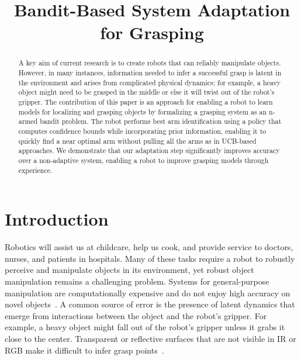 \documentclass{article}
\title{Bandit-Based System Adaptation for Grasping}
\author{}
\begin{document}
\maketitle

\begin{abstract}
A key aim of current research is to create robots that can reliably
manipulate objects.  However, in many instances, information needed to
infer a successful grasp is latent in the environment and arises from
complicated physical dynamics; for example, a heavy object might need
to be grasped in the middle or else it will twist out of the robot's
gripper.  The contribution of this paper is an approach for enabling a
robot to learn models for localizing and grasping objects by
formalizing a grasping system as an n-armed bandit problem.  The robot
performs best arm identification using a policy that computes
confidence bounds while incorporating prior information, enabling it
to quickly find a near optimal arm without pulling all the arms as in
UCB-based approaches.  We demonstrate that our adaptation step
significantly improves accuracy over a non-adaptive system, enabling a
robot to improve grasping models through experience.





\end{abstract}



\section{Introduction}


Robotics will assist us at childcare, help us cook, and provide
service to doctors, nurses, and patients in hospitals. Many of these
tasks require a robot to robustly perceive and manipulate objects in
its environment, yet robust object manipulation remains a challenging
problem.  Systems for general-purpose manipulation are computationally
expensive and do not enjoy high accuracy on novel
objects~\citep{saxena08}.  A common source of error is the presence of
latent dynamics that emerge from interactions between the object and
the robot's gripper.  For example, a heavy object might fall out of
the robot's gripper unless it grabs it close to the center.
Transparent or reflective surfaces that are not visible in IR or RGB
make it difficult to infer grasp points~\citep{lysenkov13}.
\end{document}
